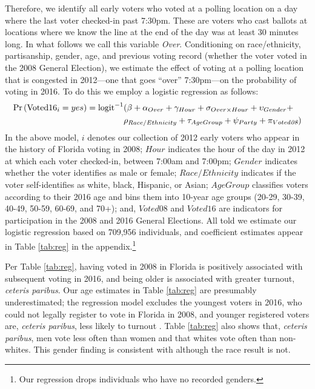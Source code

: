 \documentclass[12pt,titlepage]{article}
\begin{document}
Therefore, we identify all early voters who voted at a polling
location on a day where the last voter checked-in past 7:30pm.  These
are voters who cast ballots at locations where we know the line at the
end of the day was at least 30 minutes long.  In what follows we call
this variable \emph{Over}.  Conditioning on race/ethnicity,
partisanship, gender, age, and previous voting record (whether the
voter voted in the 2008 General Election), we estimate the effect of
voting at a polling location that is congested in 2012---one that goes
``over'' 7:30pm---on the probability of voting in 2016.  To do this we
employ a logistic regression as follows:
\begin{equation*}
  \begin{aligned}
    \textup{Pr}\left(\mathrm{Voted16}_{i} = yes\right) =  \textup{logit}^{-1}&(\beta + \alpha_{Over} + \gamma_{Hour} +
    \sigma_{Over \times Hour} + \upsilon_{Gender}  + \\& \rho_{Race/Ethnicity} +
      \tau_{Age Group} + \psi_{Party} + \pi_{Voted\emph{08}})
  \end{aligned}
\end{equation*}
%
In the above model, $i$ denotes our collection of 2012 early voters
who appear in the history of Florida voting in 2008; $Hour$ indicates
the hour of the day in 2012 at which each voter checked-in, between
7:00am and 7:00pm; $Gender$ indicates whether the voter identifies as
male or female; $Race/Ethnicity$ indicates if the voter
self-identifies as white, black, Hispanic, or Asian; $AgeGroup$
classifies voters according to their 2016 age and bins them into
10-year age groups (20-29, 30-39, 40-49, 50-59, 60-69, and 70+); and,
$Voted08$ and $Voted16$ are indicators for participation in the 2008
and 2016 General Elections.  All told we estimate our logistic
regression based on 709,956 individuals, and coefficient estimates
appear in Table \ref{tab:reg} in the
appendix.\footnote{Our regression drops individuals who have no
  recorded genders.}  %

Per Table \ref{tab:reg}, having voted in 2008 in Florida is positively
associated with subsequent voting in 2016, and being older is
associated with greater turnout, \emph{ceteris paribus}.  Our age
estimates in Table \ref{tab:reg} are presumably underestimated; the
regression model excludes the youngest voters in 2016, who could not
legally register to vote in Florida in 2008, and younger registered
voters are, \emph{ceteris paribus}, less likely to turnout
\citep{shinosmith:registrationtiming}.  Table \ref{tab:reg} also shows
that, \emph{ceteris paribus}, men vote less often than women and that
whites vote often than non-whites.  This gender finding is consistent
with \citet{leighleynagler:whovotesnow} although the race result is not.
\end{document}
